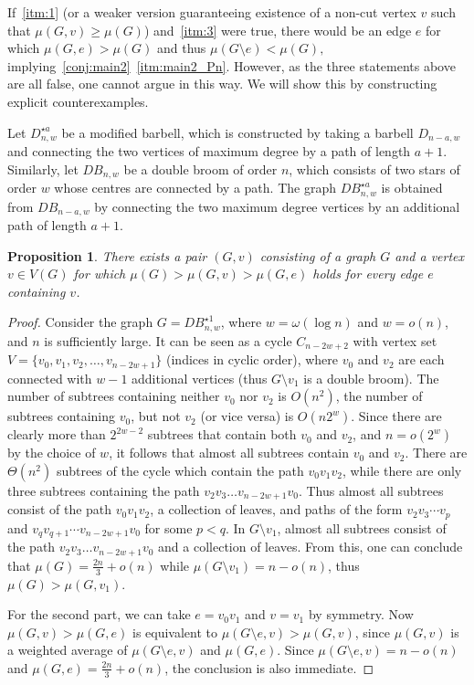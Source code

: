 \documentclass[11pt]{article}
\newtheorem{prop}[thr]{Proposition}
\theoremstyle{definition}
\begin{document}
If~\ref{itm:1} (or a weaker version guaranteeing existence of a non-cut vertex $v$ such that $\mu(G,v) \ge \mu(G)$) and~\ref{itm:3} were true, there would be an edge $e$ for which $\mu(G,e)>\mu(G)$ and thus $\mu(G \setminus e)<\mu(G),$ implying~\cref{conj:main2}~\ref{itm:main2_Pn}.
However, as the three statements above are all false, one cannot argue in this way. We will show this by constructing explicit counterexamples.

Let $D^{\star a}_{n,w}$ be a modified barbell, which is constructed by taking a barbell $D_{n-a,w}$ and connecting the two vertices of maximum degree by a path of length $a+1$.
Similarly, let $DB_{n,w}$ be a double broom of order $n$, which consists of two stars of order $w$ whose centres are connected by a path.
The graph $DB^{\star a}_{n,w}$ is obtained from $DB_{n-a,w}$ by connecting the two maximum degree vertices by an additional path of length $a+1$.

\begin{prop}\label{prop:non-monotone}
 There exists a pair $(G,v)$ consisting of a graph $G$ and a vertex $v \in V(G)$ for which $\mu(G)>\mu(G,v)>\mu(G,e)$ holds for every edge $e$ containing $v$.
\end{prop}

\begin{proof}
Consider the graph $G = DB^{\star 1}_{n,w}$, where $w=\omega(\log n)$ and $w=o(n)$, and $n$ is sufficiently large. It can be seen as a cycle $C_{n-2w+2}$ with vertex set $V=\{v_0,v_1,v_2, \ldots, v_{n-2w+1}\}$ (indices in cyclic order), where $v_0$ and $v_2$ are each connected with $w-1$ additional vertices (thus $G \setminus v_1$ is a double broom). The number of subtrees containing neither $v_0$ nor $v_2$ is $O(n^2)$, the number of subtrees containing $v_0$, but not $v_2$ (or vice versa) is $O(n2^w)$. Since there are clearly more than $2^{2w-2}$ subtrees that contain both $v_0$ and $v_2$, and $n = o(2^w)$
by the choice of $w$, it follows that almost all subtrees contain $v_0$ and $v_2$.
 There are $\Theta(n^2)$ subtrees of the cycle which contain the path $v_0v_1v_2$, while there are only three subtrees containing the path $v_2v_3 \ldots v_{n-2w+1}v_0$. Thus almost all subtrees consist of the path $v_0v_1v_2$, a collection of leaves, and paths of the form $v_2v_3 \cdots v_p$ and $v_qv_{q+1} \cdots v_{n-2w+1}v_0$ for some $p < q$. In $G \setminus v_1$, almost all subtrees consist of the path $v_2v_3 \ldots v_{n-2w+1}v_0$ and a collection of leaves.
  From this, one can conclude that $\mu(G)= \frac{2n}{3} + o(n)$ while $\mu(G \setminus v_1) = n-o(n)$, thus $\mu(G) > \mu(G,v_1)$.

 For the second part, we can take $e=v_0v_1$ and $v=v_1$ by symmetry.
 Now $\mu(G,v)>\mu(G,e)$ is equivalent to
 $\mu(G \setminus e,v )>\mu(G,v)$, since $\mu(G,v)$ is a weighted average of $\mu(G \setminus e,v )$ and $ \mu(G,e)$.
 Since $\mu(G \setminus e,v ) = n - o(n)$ and $\mu(G,e)=\frac{2n}{3} + o(n)$, the conclusion is also immediate.
\end{proof}
\end{document}
